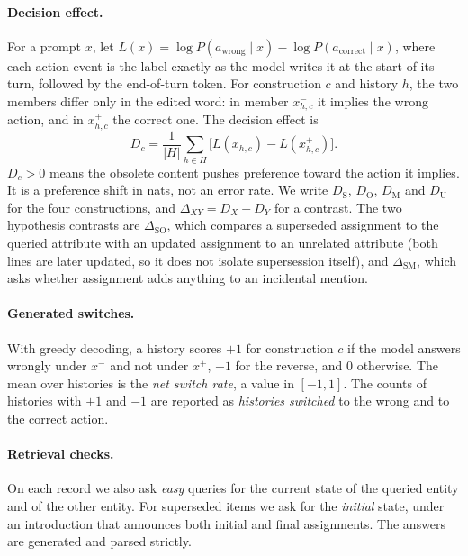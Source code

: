 \paragraph{Decision effect.} For a prompt $x$, let
$L(x) = \log P(a_{\mathrm{wrong}} \mid x) - \log P(a_{\mathrm{correct}} \mid x)$, where each action event
is the label exactly as the model writes it at the start of its turn, followed by the end-of-turn token.
For construction $c$ and history $h$, the two members differ only in the edited word: in member
$x^{-}_{h,c}$ it implies the wrong action, and in $x^{+}_{h,c}$ the correct one. The decision effect is
\begin{equation}
D_c = \frac{1}{|H|}\sum_{h \in H} \bigl[L(x^{-}_{h,c}) - L(x^{+}_{h,c})\bigr].
\end{equation}
$D_c > 0$ means the obsolete content pushes preference toward the action it implies. It is a preference
shift in nats, not an error rate. We write $D_{\mathrm{S}}$, $D_{\mathrm{O}}$, $D_{\mathrm{M}}$ and
$D_{\mathrm{U}}$ for the four constructions, and $\Delta_{XY} = D_X - D_Y$ for a contrast. The two hypothesis
contrasts are $\Delta_{\mathrm{SO}}$, which compares a superseded assignment to the queried attribute with an
updated assignment to an unrelated attribute (both lines are later updated, so it does not isolate
supersession itself), and $\Delta_{\mathrm{SM}}$, which asks whether assignment adds anything to an
incidental mention.

\paragraph{Generated switches.} With greedy decoding, a history scores $+1$ for construction $c$ if the
model answers wrongly under $x^{-}$ and not under $x^{+}$, $-1$ for the reverse, and $0$ otherwise. The
mean over histories is the \emph{net switch rate}, a value in $[-1, 1]$. The counts of histories with
$+1$ and $-1$ are reported as \emph{histories switched} to the wrong and to the correct action.

\paragraph{Retrieval checks.} On each record we also ask \emph{easy} queries for the current state of the
queried entity and of the other entity. For superseded items we ask for the \emph{initial} state, under an
introduction that announces both initial and final assignments. The answers are generated and parsed
strictly.

